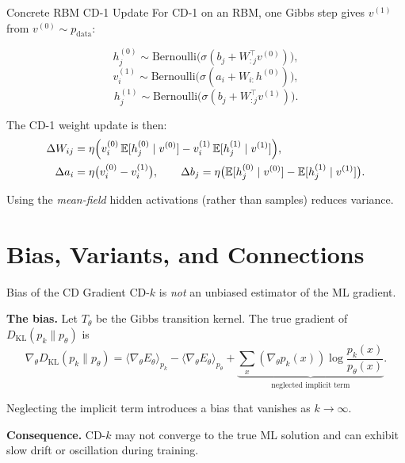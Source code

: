 \documentclass[aspectratio=169]{beamer}
\newcommand{\E}{\mathbb{E}}
\newcommand{\sigmoid}{\sigma}
\newcommand{\pdata}{p_{\mathrm{data}}}
\newcommand{\pmodel}{p_{\theta}}
\newcommand{\DKL}{D_{\mathrm{KL}}}
\begin{document}
\begin{frame}{Concrete RBM CD-1 Update}
For CD-1 on an RBM, one Gibbs step gives $v^{(1)}$ from $v^{(0)}\sim\pdata$:

\[
  h_j^{(0)} \sim \mathrm{Bernoulli}\!\bigl(\sigmoid(b_j + W_{:j}^\top v^{(0)})\bigr),
\]
\[
  v_i^{(1)} \sim \mathrm{Bernoulli}\!\bigl(\sigmoid(a_i + W_{i:} h^{(0)})\bigr),
\]
\[
  h_j^{(1)} \sim \mathrm{Bernoulli}\!\bigl(\sigmoid(b_j + W_{:j}^\top v^{(1)})\bigr).
\]

The CD-1 weight update is then:
\begin{align*}
  \Delta W_{ij}
  &= \eta\Bigl(v_i^{(0)}\,\E[h_j^{(0)}\mid v^{(0)}]
               - v_i^{(1)}\,\E[h_j^{(1)}\mid v^{(1)}]\Bigr), \\
  \Delta a_i
  &= \eta\bigl(v_i^{(0)} - v_i^{(1)}\bigr), \qquad
  \Delta b_j
   = \eta\bigl(\E[h_j^{(0)}\mid v^{(0)}] - \E[h_j^{(1)}\mid v^{(1)}]\bigr).
\end{align*}

Using the \emph{mean-field} hidden activations (rather than samples) reduces variance.
\end{frame}

\section{Bias, Variants, and Connections}

\begin{frame}{Bias of the CD Gradient}
CD-$k$ is \emph{not} an unbiased estimator of the ML gradient.

\medskip
\textbf{The bias.} Let $T_\theta$ be the Gibbs transition kernel.  The true
gradient of $\DKL(p_k\|\pmodel)$ is
\[
  \nabla_\theta\DKL(p_k\|\pmodel)
  = \langle\nabla_\theta E_\theta\rangle_{p_k}
    - \langle\nabla_\theta E_\theta\rangle_{\pmodel}
    + \underbrace{\sum_x (\nabla_\theta p_k(x))
      \log\frac{p_k(x)}{\pmodel(x)}}_{\text{neglected implicit term}}.
\]

Neglecting the implicit term introduces a bias that vanishes as $k\to\infty$.

\medskip
\textbf{Consequence.} CD-$k$ may not converge to the true ML solution and can
exhibit slow drift or oscillation during training.
\end{frame}
\end{document}
